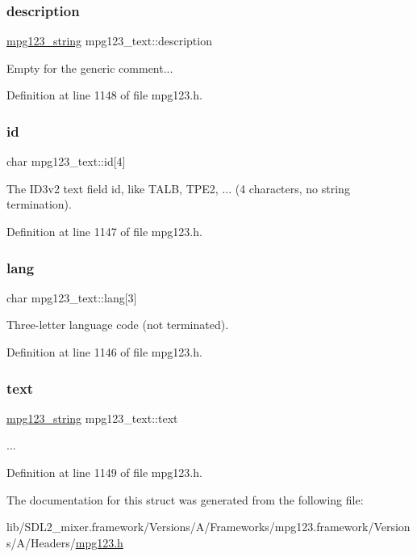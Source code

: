 \subsubsection{\texorpdfstring{description}{description}}
{\footnotesize\ttfamily \mbox{\hyperlink{structmpg123__string}{mpg123\+\_\+string}} mpg123\+\_\+text\+::description}

Empty for the generic comment... 

Definition at line 1148 of file mpg123.\+h.

\mbox{\label{structmpg123__text_a8a75ed97a1d8a019a3944935c1339fdb}} 
\subsubsection{\texorpdfstring{id}{id}}
{\footnotesize\ttfamily char mpg123\+\_\+text\+::id\mbox{[}4\mbox{]}}

The I\+D3v2 text field id, like T\+A\+LB, T\+P\+E2, ... (4 characters, no string termination). 

Definition at line 1147 of file mpg123.\+h.

\mbox{\label{structmpg123__text_a19f010dbd07ec10efa80d909768372e6}} 
\subsubsection{\texorpdfstring{lang}{lang}}
{\footnotesize\ttfamily char mpg123\+\_\+text\+::lang\mbox{[}3\mbox{]}}

Three-\/letter language code (not terminated). 

Definition at line 1146 of file mpg123.\+h.

\mbox{\label{structmpg123__text_a574b9464a996281f629858c0216eae18}} 
\subsubsection{\texorpdfstring{text}{text}}
{\footnotesize\ttfamily \mbox{\hyperlink{structmpg123__string}{mpg123\+\_\+string}} mpg123\+\_\+text\+::text}

... 

Definition at line 1149 of file mpg123.\+h.



The documentation for this struct was generated from the following file\+:\begin{DoxyCompactItemize}
\item 
lib/\+S\+D\+L2\+\_\+mixer.\+framework/\+Versions/\+A/\+Frameworks/mpg123.\+framework/\+Versions/\+A/\+Headers/\mbox{\hyperlink{mpg123_8h}{mpg123.\+h}}\end{DoxyCompactItemize}
